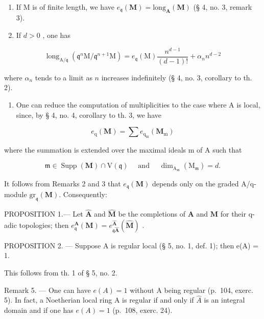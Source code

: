 \begin{enumerate}
\def\labelenumi{\arabic{enumi})}
\setcounter{enumi}{1}
\item
  If M is of finite length, we have \(e_{\mathfrak{q}}(\mathbf{M}) = \mathrm{long}_{\mathbf{A}}(\mathbf{M})\) (§ 4, no. 3, remark 3).
\item
  If \(d > 0\) , one has
\end{enumerate}

\[
\operatorname{long} _ {\mathrm{A} / \mathfrak {q}} (\mathfrak {q} ^ {n} \mathrm{M} / \mathfrak {q} ^ {n + 1} \mathrm{M}) = e _ {\mathfrak {q}} (\mathrm{M}) \frac {n ^ {d - 1}}{(d - 1) !} + \alpha_ {n} n ^ {d - 2}
\]

where \(\alpha_{n}\) tends to a limit as \(n\) increases indefinitely (§ 4, no. 3, corollary to th. 2).

\begin{enumerate}
\def\labelenumi{\arabic{enumi})}
\setcounter{enumi}{3}
\tightlist
\item
  One can reduce the computation of multiplicities to the case where A is local, since, by § 4, no. 4, corollary to th. 3, we have
\end{enumerate}

\[
e _ {\mathrm{q}} (\mathbf {M}) = \sum e _ {\mathrm{q} _ {\mathrm{m}}} (\mathbf {M} _ {\mathrm{m}})
\]

where the summation is extended over the maximal ideals m of A such that

\[
\mathfrak {m} \in \operatorname{Supp} (\mathbf {M}) \cap \mathrm{V} (\mathfrak {q}) \quad \text { and } \quad \dim_ {\mathrm{A} _ {\mathfrak {m}}} (\mathrm{M} _ {\mathfrak {m}}) = d  .
\]

It follows from Remarks 2 and 3 that \(e_{\mathfrak{q}}(\mathbf{M})\) depends only on the graded A/q-module \(\mathrm{gr}_{\mathfrak{q}}(\mathbf{M})\). Consequently:

PROPOSITION 1.--- Let \(\hat{\mathbf{A}}\) and \(\hat{\mathbf{M}}\) be the completions of \(\mathbf{A}\) and \(\mathbf{M}\) for their q-adic topologies; then \(e_{\mathfrak{q}}^{\mathbf{A}}(\mathbf{M}) = e_{\mathfrak{q}\hat{\mathbf{A}}}^{\hat{\mathbf{A}}}(\hat{\mathbf{M}})\) .

PROPOSITION 2. --- Suppose A is regular local (§ 5, no. 1, def. 1); then e(A) = 1.

This follows from th. 1 of § 5, no. 2.

Remark 5. --- One can have \(e(A) = 1\) without A being regular (p.~104, exerc. 5). In fact, a Noetherian local ring A is regular if and only if \(\hat{A}\) is an integral domain and if one has \(e(A) = 1\) (p.~108, exerc. 24).

